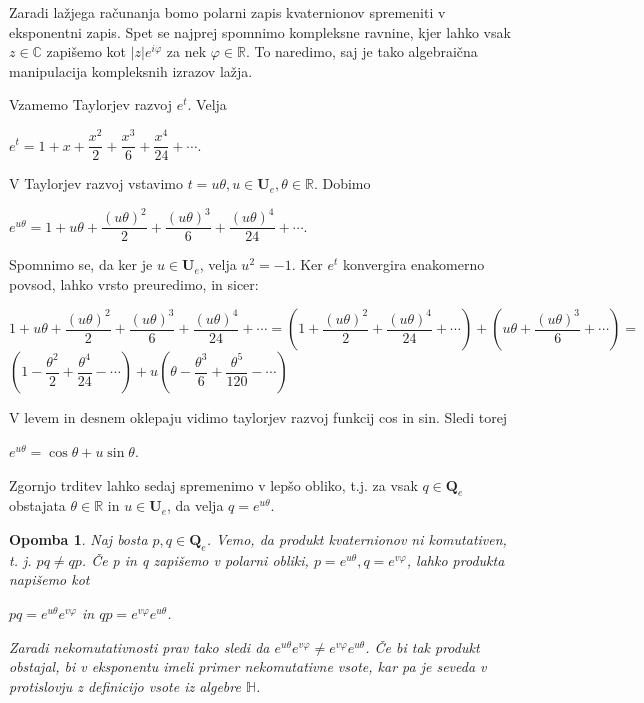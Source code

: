 \documentclass[a4paper,12pt]{article}
\def\R{\mathbb{R}} %
\def\C{\mathbb{C}} %
\def\H{\mathbb{H}} %
\def\Qe{\textbf{Q}_{e}} %
\def\Ue{\textbf{U}_{e}} %
\newtheorem{opomba}{Opomba}
\begin{document}
Zaradi lažjega računanja bomo polarni zapis kvaternionov spremeniti v eksponentni zapis. Spet se najprej spomnimo kompleksne ravnine, kjer lahko
vsak $z \in \C$ zapišemo kot $|z|e^{i\varphi}$ za nek $\varphi \in \R$. To naredimo, saj je tako
algebraična manipulacija kompleksnih izrazov lažja.

Vzamemo Taylorjev razvoj $e^t$. Velja
\begin{center}
   $e^t = 1+x+\dfrac{x^2}{2}+\dfrac{x^3}{6}+\dfrac{x^4}{24} + \cdots$.
\end{center}
V Taylorjev razvoj vstavimo $t = u\theta, u \in \Ue, \theta \in \R$. Dobimo %
\begin{center}
   $e^{u\theta} = 1 + u\theta + \dfrac{(u\theta)^2}{2} + \dfrac{(u\theta)^3}{6} + \dfrac{(u\theta)^4}{24} + \cdots$.
\end{center}
Spomnimo se, da ker je $u \in \Ue$, velja $u^2=-1$. Ker $e^t$ konvergira enakomerno povsod, lahko vrsto preuredimo, in sicer:
\begin{center}
   $1 + u\theta + \dfrac{(u\theta)^2}{2} + \dfrac{(u\theta)^3}{6} + \dfrac{(u\theta)^4}{24} + \cdots = (1 + \dfrac{(u\theta)^2}{2} + \dfrac{(u\theta)^4}{24}+ \cdots) + (u\theta + \dfrac{(u\theta)^3}{6} + \cdots) = $
   $(1-\dfrac{\theta^2}{2}+\dfrac{\theta^4}{24}- \cdots) + u(\theta - \dfrac{\theta^3}{6} +\dfrac{\theta^5}{120} - \cdots)$
\end{center}
\break
V levem in desnem oklepaju vidimo taylorjev razvoj funkcij cos in sin. Sledi torej
\begin{center}
   $e^{u\theta} = \cos\theta  + u\sin\theta$.
\end{center}
Zgornjo trditev lahko sedaj spremenimo v lepšo obliko, t.j. za vsak $q \in \Qe$ obstajata
$\theta \in \R$ in $u \in \Ue$, da velja $q =  e^{u\theta}$.

\begin{opomba} 
Naj bosta $p,q \in \Qe$. Vemo, da produkt kvaternionov ni komutativen, t. j. $p q \neq q p$. Če p in q zapišemo v polarni obliki, 
$p = e^{u\theta}, q = e^{v\varphi}$, lahko produkta napišemo kot
\begin{center}
   $p q = e^{u\theta} e^{v\varphi}$ in $q p = e^{v\varphi}e^{u\theta}$.
\end{center}
Zaradi nekomutativnosti prav tako sledi da $e^{u\theta} e^{v\varphi} \neq e^{v\varphi}e^{u\theta}$. Če bi tak produkt obstajal, bi v eksponentu imeli primer nekomutativne vsote,
kar pa je seveda v protislovju z definicijo vsote iz algebre $\H$.
\end{opomba}
\end{document}
